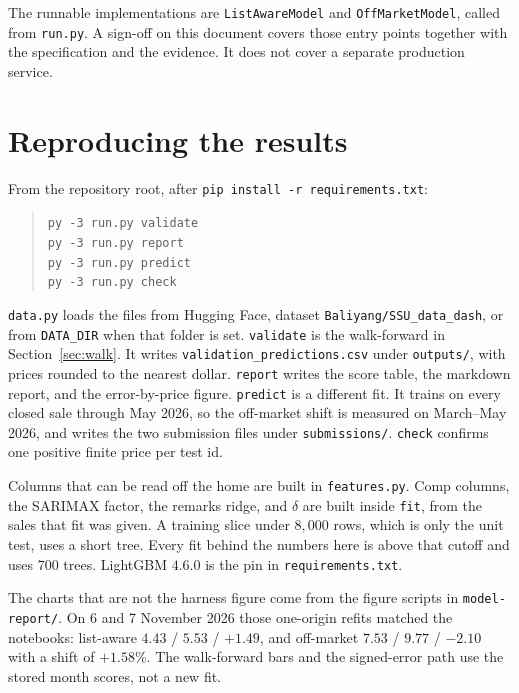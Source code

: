 \documentclass[11pt]{article}
\begin{document}
The runnable implementations are \texttt{ListAwareModel} and \texttt{OffMarketModel}, called from \texttt{run.py}. A sign-off on this document covers those entry points together with the specification and the evidence. It does not cover a separate production service.

\section{Reproducing the results}
\label{sec:repro}

From the repository root, after \texttt{pip install -r requirements.txt}:

\begin{quote}
\texttt{py -3 run.py validate}\\
\texttt{py -3 run.py report}\\
\texttt{py -3 run.py predict}\\
\texttt{py -3 run.py check}
\end{quote}

\texttt{data.py} loads the files from Hugging Face, dataset \texttt{Baliyang/SSU\_data\_dash}, or from \texttt{DATA\_DIR} when that folder is set. \texttt{validate} is the walk-forward in Section~\ref{sec:walk}. It writes \texttt{validation\_predictions.csv} under \texttt{outputs/}, with prices rounded to the nearest dollar. \texttt{report} writes the score table, the markdown report, and the error-by-price figure. \texttt{predict} is a different fit. It trains on every closed sale through May 2026, so the off-market shift is measured on March--May 2026, and writes the two submission files under \texttt{submissions/}. \texttt{check} confirms one positive finite price per test id.

Columns that can be read off the home are built in \texttt{features.py}. Comp columns, the SARIMAX factor, the remarks ridge, and \(\delta\) are built inside \texttt{fit}, from the sales that fit was given. A training slice under \(8{,}000\) rows, which is only the unit test, uses a short tree. Every fit behind the numbers here is above that cutoff and uses 700 trees. LightGBM \(4.6.0\) is the pin in \texttt{requirements.txt}.

The charts that are not the harness figure come from the figure scripts in \texttt{model-report/}. On 6 and 7 November 2026 those one-origin refits matched the notebooks: list-aware \(4.43\) / \(5.53\) / \(+1.49\), and off-market \(7.53\) / \(9.77\) / \(-2.10\) with a shift of \(+1.58\%\). The walk-forward bars and the signed-error path use the stored month scores, not a new fit.
\end{document}
